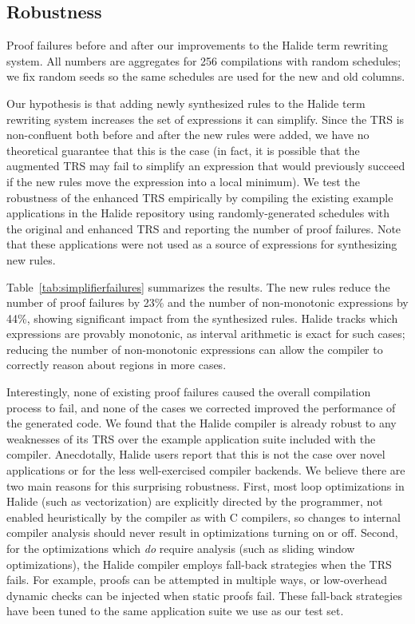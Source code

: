\documentclass[sigplan,10pt,review,anonymous]{acmart}\settopmatter{printfolios=true,printccs=false,printacmref=false}
\begin{document}
\subsection{Robustness}
\begin{table}[!ht]
  \caption{Proof failures before and after our improvements to the Halide term rewriting system.
    All numbers are aggregates for 256 compilations with random schedules; we fix random seeds so
    the same schedules are used for the new and old columns.}
  \label{tab:simplifierfailures}
  \small
  
\end{table}

Our hypothesis is that adding newly synthesized rules to the Halide
term rewriting system increases the set of expressions it can simplify. Since the
TRS is non-confluent both before and after the new rules were added, we
have no theoretical guarantee that this is the case (in fact, it is possible
that the augmented TRS may fail to simplify an expression that would
previously succeed if the new rules move the expression into a local
minimum). We test the robustness of the enhanced TRS empirically by
compiling the existing example applications in the Halide repository
using randomly-generated schedules with the original and enhanced TRS
and reporting the number of proof failures.
Note that these applications were not used as a source of expressions for synthesizing new rules.

Table~\ref{tab:simplifierfailures} summarizes the results.  The new rules
reduce the number of proof failures by 23\% and the number of non-monotonic expressions
by 44\%, showing significant impact from the synthesized rules.  Halide tracks
which expressions are provably monotonic, as interval arithmetic is exact for
such cases; reducing the number of non-monotonic expressions can allow the
compiler to correctly reason about regions in more cases.

Interestingly, none of existing proof failures caused the overall compilation process to fail, and none of the cases we corrected improved the performance of the generated code. %
We found that the Halide compiler is already robust to any weaknesses of its TRS over the example application suite included with the compiler. Anecdotally, Halide users report that this is not the case over novel applications or for the less well-exercised compiler backends. We believe there are two main reasons for this surprising robustness. First, most loop optimizations in Halide (such as vectorization) are explicitly directed by the programmer, not enabled heuristically by the compiler as with C compilers, so changes to internal compiler analysis should never result in optimizations turning on or off. Second, for the optimizations which \emph{do} require analysis (such as sliding window optimizations), the Halide compiler employs fall-back strategies when the TRS fails. For example, proofs can be attempted in multiple ways, or low-overhead dynamic checks can be injected when static proofs fail. These fall-back strategies have been tuned to the same application suite we use as our test set.
\end{document}
